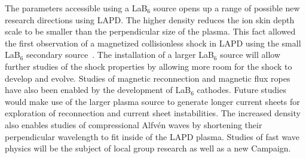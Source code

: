 \documentclass[11pt]{article}
\renewcommand{\cite}{\citep}
\begin{document}
The parameters accessible using a LaB$_6$ source opens up a range of
possible new research directions using LAPD.  The higher density
reduces the ion skin depth scale to be smaller than the perpendicular
size of the plasma.  This fact allowed the first observation of a
magnetized collisionless shock in LAPD using the small LaB$_6$
secondary source~\cite{schaeffer:2014,niemann:2014}.  The installation of a larger LaB$_6$ source
will allow further studies of the shock properties by allowing more room
for the shock to develop and evolve.  Studies of magnetic
reconnection and magnetic flux ropes have also been enabled by the
development of LaB$_6$ cathodes.  Future studies would make use of the larger
plasma source to generate longer current sheets for exploration of
reconnection and current sheet instabilities.  The increased
density also enables studies of compressional Alfv\'{e}n waves by
shortening their perpendicular wavelength to fit inside of the LAPD plasma.
Studies of fast wave physics will be the subject of local group
research as well as a new Campaign.  
\end{document}
